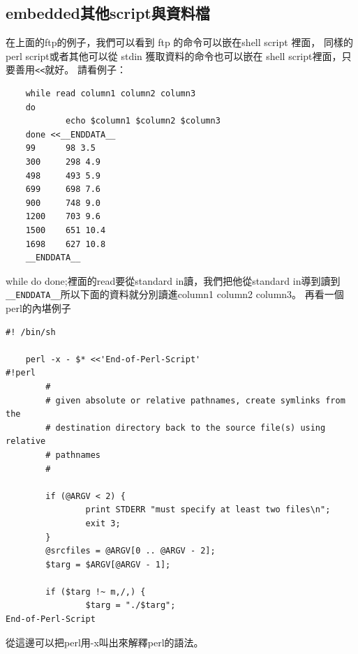     \subsection{embedded其他script與資料檔}
    在上面的ftp的例子，我們可以看到 ftp 的命令可以嵌在shell script 裡面，
    同樣的perl script或者其他可以從 stdin 獲取資料的命令也可以嵌在 shell
    script裡面，只要善用\verb=<<=就好。
    請看例子：
    \begin{verbatim}
    while read column1 column2 column3
    do
            echo $column1 $column2 $column3
    done <<__ENDDATA__
    99      98 3.5
    300     298 4.9
    498     493 5.9
    699     698 7.6
    900     748 9.0
    1200    703 9.6
    1500    651 10.4
    1698    627 10.8
    __ENDDATA__
    \end{verbatim}
    while do done;裡面的read要從standard in讀，我們把他從standard in導到讀到
    \verb=__ENDDATA__=所以下面的資料就分別讀進column1 column2 column3。
    再看一個perl的內堪例子
    \begin{verbatim}
#! /bin/sh

    perl -x - $* <<'End-of-Perl-Script'
#!perl
        #
        # given absolute or relative pathnames, create symlinks from the
        # destination directory back to the source file(s) using relative
        # pathnames
        #
         
        if (@ARGV < 2) {
                print STDERR "must specify at least two files\n";
                exit 3;                                          
        }
        @srcfiles = @ARGV[0 .. @ARGV - 2];
        $targ = $ARGV[@ARGV - 1];

        if ($targ !~ m,/,) {
                $targ = "./$targ";
End-of-Perl-Script
    \end{verbatim}
    從這邊可以把perl用-x叫出來解釋perl的語法。

